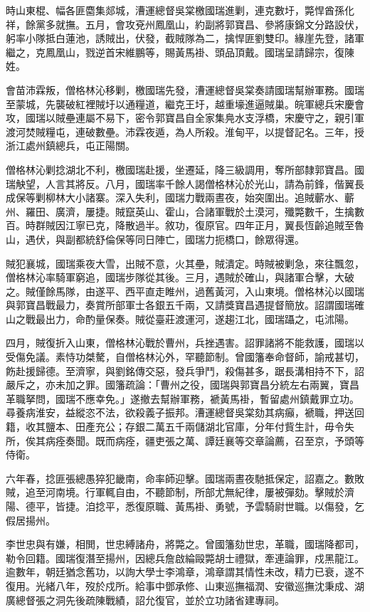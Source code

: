 \begin{pinyinscope}
時山東棍、幅各匪麕集郯城，漕運總督吳棠檄國瑞進剿，連克數圩，斃悍酋孫化祥，餘黨多就撫。五月，會攻兗州鳳凰山，約副將郭寶昌、參將康錦文分路設伏，躬率小隊抵白蓮池，誘賊出，伏發，截賊隊為二，擒悍匪劉雙印。緣崖先登，諸軍繼之，克鳳凰山，戮逆首宋維鵬等，賜黃馬褂、頭品頂戴。國瑞呈請歸宗，復陳姓。

會苗沛霖叛，僧格林沁移剿，檄國瑞先發，漕運總督吳棠奏請國瑞幫辦軍務。國瑞至蒙城，先襲破紅裡賊圩以通糧道，繼克王圩，越重壕進逼賊巢。皖軍總兵宋慶會攻，國瑞以賊壘連屬不易下，密令郭寶昌自全家集鳧水支浮橋，宋慶守之，親引軍渡河焚賊糧屯，連破數壘。沛霖夜遁，為人所殺。淮甸平，以提督記名。三年，授浙江處州鎮總兵，屯正陽關。

僧格林沁剿捻湖北不利，檄國瑞赴援，坐遷延，降三級調用，奪所部隸郭寶昌。國瑞觖望，人言其將反。八月，國瑞率千餘人謁僧格林沁於光山，請為前鋒，偕翼長成保等剿柳林大小諸寨。深入失利，國瑞力戰兩晝夜，始突圍出。追賊蘄水、蘄州、羅田、廣濟，屢捷。賊竄英山、霍山，合諸軍戰於土漠河，殲斃數千，生擒數百。時群賊因江寧已克，降散過半。敘功，復原官。四年正月，翼長恆齡追賊至魯山，遇伏，與副都統舒倫保等同日陣亡，國瑞力扼橋口，餘眾得還。

賊犯襄城，國瑞乘夜大雪，出賊不意，火其壘，賊潰定。時賊被剿急，來往飄忽，僧格林沁率騎軍窮追，國瑞步隊從其後。三月，遇賊於確山，與諸軍合擊，大破之。賊僅餘馬隊，由遂平、西平直走睢州，過舊黃河，入山東境。僧格林沁以國瑞與郭寶昌戰最力，奏賞所部軍士各銀五千兩，又請獎寶昌遇提督簡放。詔謂國瑞確山之戰最出力，命酌量保奏。賊從臺莊渡運河，遂趨江北，國瑞躡之，屯沭陽。

四月，賊復折入山東，僧格林沁戰於曹州，兵挫遇害。詔罪諸將不能救護，國瑞以受傷免議。素恃功桀驁，自僧格林沁外，罕聽節制。曾國籓奉命督師，諭戒甚切，飭赴援歸德。至濟寧，與劉銘傳交惡，發兵爭鬥，殺傷甚多，踞長溝相持不下，詔嚴斥之，亦未加之罪。國籓疏論：「曹州之役，國瑞與郭寶昌分統左右兩翼，寶昌革職拏問，國瑞不應幸免。」遂撤去幫辦軍務，褫黃馬褂，暫留處州鎮戴罪立功。尋養病淮安，益縱恣不法，欲殺義子振邦。漕運總督吳棠劾其病癲，褫職，押送回籍，收其鹽本、田產充公；存銀二萬五千兩儲湖北官庫，分年付貲生計，毋令失所，俟其病痊奏聞。既而病痊，疆吏張之萬、譚廷襄等交章論薦，召至京，予頭等侍衛。

六年春，捻匪張總愚猝犯畿南，命率師迎擊。國瑞兩晝夜馳抵保定，詔嘉之。數敗賊，追至河南境。行軍輒自由，不聽節制，所部尤無紀律，屢被彈劾。擊賊於濟陽、德平，皆捷。洎捻平，悉復原職、黃馬褂、勇號，予雲騎尉世職。以傷發，乞假居揚州。

李世忠與有嫌，相閧，世忠縛諸舟，將斃之。曾國籓劾世忠，革職，國瑞降都司，勒令回籍。國瑞復潛至揚州，因總兵詹啟綸毆斃胡士禮獄，牽連論罪，戍黑龍江。逾數年，朝廷猶念舊功，以詢大學士李鴻章，鴻章謂其情性未改，精力已衰，遂不復用。光緒八年，歿於戍所。給事中鄧承修、山東巡撫福潤、安徽巡撫沈秉成、湖廣總督張之洞先後疏陳戰績，詔允復官，並於立功諸省建專祠。


\end{pinyinscope}
